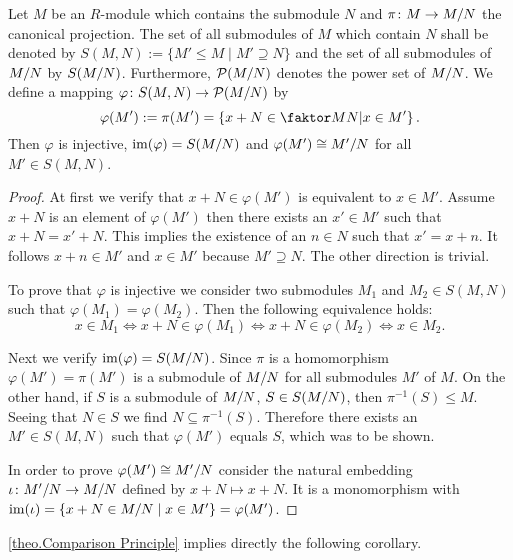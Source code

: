 \begin{thm} \label{theo.Comparison Principle}
Let $M$ be an $R$-module which contains the submodule $N$ and $\pi\colon M\to\MtN$ the canonical projection. The set of all submodules of $M$ which contain $N$ shall be denoted by $S(M,N):=\lbrace M'\leq M \mid M'\supseteq N\rbrace$ and the set of all submodules of $\MtN$ by $S(\MtN)$. Furthermore, $\mathcal{P}(\MtN)$ denotes the power set of $\MtN$. We define a mapping $\varphi\colon S(M,N)\to \mathcal{P}(\MtN)$ by
\begin{equation*}
\varphi(M'):=\pi(M')=\left\lbrace x+N\in \MTN \middle\arrowvert x\in M'\right\rbrace.
\end{equation*}
Then $\varphi$ is injective, $\im(\varphi)=S(\MtN)$ and $\varphi(M')\cong\nicefrac{M'}{N}$ for all $M'\in S(M,N)$.
\end{thm}
\begin{proof}
At first we verify that $x+N\in \varphi(M')$ is equivalent to $x\in M'$. Assume $x+N$ is an element of $\varphi(M')$ then there exists an $x'\in M'$ such that $x+N=x'+N$. This implies the existence of an $n\in N$ such that $x'=x+n$. It follows $x+n\in M'$ and $x\in M'$ because $M'\supseteq N$. The other direction is trivial.

To prove that $\varphi$ is injective we consider two submodules $M_1$ and $M_2\in S(M,N)$ such that $\varphi(M_1)=\varphi(M_2)$. Then the following equivalence holds:
\begin{equation*}
x\in M_1\Leftrightarrow x+N\in \varphi(M_1)\Leftrightarrow x+N\in\varphi(M_2)\Leftrightarrow x\in M_2.
\end{equation*}

Next we verify $\im(\varphi)=S(\MtN)$. Since $\pi$ is a homomorphism $\varphi(M')=\pi(M')$ is a submodule of $\MtN$ for all submodules $M'$ of $M$. On the other hand, if $S$ is a submodule of $\MtN$, \ie $S\in S(\MtN)$, then $\pi^{-1}(S)\leq M$. Seeing that $N\in S$ we find $N\subseteq\pi^{-1}(S)$. Therefore there exists an $M'\in S(M,N)$ such that $\varphi(M')$ equals $S$, which was to be shown.

In order to prove $\varphi(M')\cong\nicefrac{M'}{N}$ consider the natural embedding $\iota\colon \nicefrac{M'}{N}\to\MtN$ defined by $x+N\mapsto x+N$. It is a monomorphism with $\im(\iota)=\lbrace x+N\in\MtN \mid x\in M'\rbrace=\varphi(M')$.
\end{proof}

\cref{theo.Comparison Principle} implies directly the following corollary.

